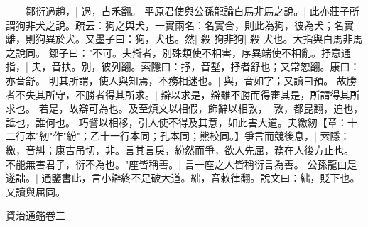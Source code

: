 　　鄒衍過趙，|{
	過，古禾翻。
	}
平原君使與公孫龍論白馬非馬之說。|{
	此亦莊子所謂狗非犬之說。疏云：狗之與犬，一實兩名：名實合，則此為狗，彼為犬；名實離，則狗異於犬。又墨子曰：狗，犬也。然|{
	殺
	}
狗非狗|{
	殺
	}
犬也。大指與白馬非馬之說同。
}
鄒子曰："不可。夫辯者，別殊類使不相害，序異端使不相亂。抒意通指，|{
	夫，音扶。別，彼列翻。索隱曰：抒，音墅，抒者舒也；又常恕翻。康曰：亦音舒。
	}
明其所謂，使人與知焉，不務相迷也。|{
	與，音如字；又讀曰預。
	}
故勝者不失其所守，不勝者得其所求。|{
	辯以求是，辯雖不勝而得審其是，所謂得其所求也。
	}
若是，故辯可為也。及至煩文以相假，飾辭以相敦，|{
	敦，都昆翻，迫也，詆也，誰何也。
	}
巧譬以相移，引人使不得及其意，如此害大道。夫繳紉【章：十二行本"紉"作"紛"；乙十一行本同；孔本同；熊校同。】爭言而競後息，|{
	索隱：繳，音糾；康吉吊切，非。言其言戾，紛然而爭，欲人先屈，務在人後方止也。
	}
不能無害君子，衍不為也。"座皆稱善。|{
	言一座之人皆稱衍言為善。
	}
公孫龍由是遂詘。|{
	通鑒書此，言小辯終不足破大道。絀，音敕律翻。說文曰：絀，貶下也。又讀與屈同。
	}

資治通鑑卷三
